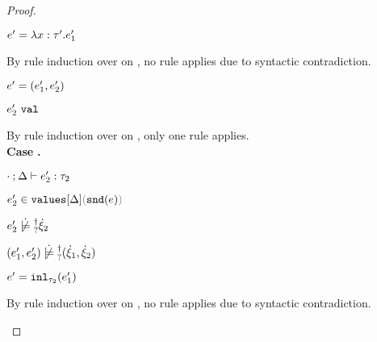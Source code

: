 \begin{proof}
\begin{byCases}
\begin{byCases}
\begin{byCases}
\begin{byCases}
\begin{byCases}
\begin{byCases}
\begin{byCases}
                \begin{pfsteps*} 
                \item $e'=\lambda x:\tau'.e_1'$ 
                \end{pfsteps*}
                By rule induction over  on , no rule applies due to syntactic contradiction.
                \item[\text{(\ref{rule:VPair})}] 
                \begin{pfsteps*} 
                \item $e'=(e_1' , e_2')$ 
                \item $e_2' ~\mathtt{val}$  
                \end{pfsteps*}
                By rule induction over  on , only one rule applies. \\
                  \textbf{Case} \text{(\ref{rule:TPair})}\textbf{.}
                  \begin{pfsteps*}
                  \item $\cdot \mathbin{;} \Delta \vdash e_2' : \tau_2$  
                  \item $\inValues{e_2'}{\Delta}{\hsnd{e}}$  
                  \item $\cnotsatisfyormay{e_2'}{\hxi_2}$  
                  \item $\cnotsatisfyormay{\hpair{e_1'}{e_2'}}{\cpair{\hxi_1}{\hxi_2}}$ 
                  \end{pfsteps*}
                \item[\text{(\ref{rule:VInl})}] 
                \begin{pfsteps*} 
                \item $e'=\mathtt{inl}_{\tau_2}({e_1'})$ 
                \end{pfsteps*}
                By rule induction over  on , no rule applies due to syntactic contradiction.
                \item[\text{(\ref{rule:VInr})}] 

\end{byCases}
\end{byCases}
\end{byCases}
\end{byCases}
\end{byCases}
\end{byCases}
\end{byCases}
\end{proof}
